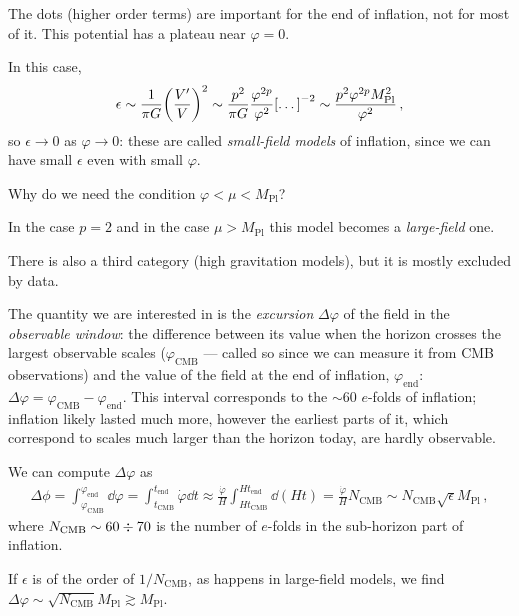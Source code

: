 \documentclass[main.tex]{subfiles}
\begin{document}
The dots (higher order terms) are important for the end of inflation, not for most of it. 
This potential has a plateau near \(\varphi = 0\).

In this case, 
%
\begin{align}
\epsilon \sim \frac{1}{\pi G} \qty(\frac{V'}{V})^2
\sim \frac{p^2}{\pi G} \frac{\varphi^{2 p }}{\varphi^2}  \qty[\dots]^{-2} 
\sim \frac{p^2 \varphi^{2p} M _{\text{Pl}}^2}{\varphi^2} 
\,,
\end{align}
%
so \(\epsilon \to 0\) as \(\varphi \to 0\): these are called \emph{small-field models} of inflation, since we can have small \(\epsilon \) even with small \(\varphi \).

Why do we need the condition \(\varphi < \mu < M _{\text{Pl}}\)? 

\begin{claim}
In the case \(p = 2\) and in the case \(\mu > M _{\text{Pl}}\) this model becomes a \emph{large-field} one. 
\end{claim}

There is also a third category (high gravitation models), but it is mostly excluded by data. 

The quantity we are interested in is the \emph{excursion} \(\Delta \varphi \) of the field in the \emph{observable window}: the difference between its value when the horizon crosses the largest observable scales (\(\varphi _{\text{CMB}}\) --- called so since we can measure it from CMB observations) and the value of the field at the end of inflation, \(\varphi _{\text{end}}\): \(\Delta \varphi = \varphi _{\text{CMB}} - \varphi _{\text{end}}\). 
This interval corresponds to the \(\sim 60\) \(e\)-folds of inflation; inflation likely lasted much more, however the earliest parts of it, which correspond to scales much larger than the horizon today, are hardly observable. 

We can compute \(\Delta \varphi \) as 
%
\begin{align}
\Delta  \phi = \int_{\varphi _{\text{CMB}}}^{\varphi _{\text{end}}} \dd{\varphi } = \int_{t _{\text{CMB}}}^{t _{\text{end}}} \dot{\varphi} \dd{t} \approx \frac{\dot{\varphi}}{H} \int_{H t _{\text{CMB}}}^{H t _{\text{end}}} \dd{(Ht)} = \frac{\dot{\varphi}}{H} 
N _{\text{CMB}} \sim N _{\text{CMB}} \sqrt{\epsilon } M _{\text{Pl}}
\,,
\end{align}
%
where \(N _{\text{CMB}} \sim 60 \divisionsymbol 70\) is the number of \(e\)-folds in the sub-horizon part of inflation. 

If \(\epsilon \) is of the order of \(1 / N _{\text{CMB}}\), as happens in large-field models, we find \(\Delta \varphi \sim \sqrt{N _{\text{CMB}}} M _{\text{Pl}} \gtrsim M _{\text{Pl}}\).
\end{document}

